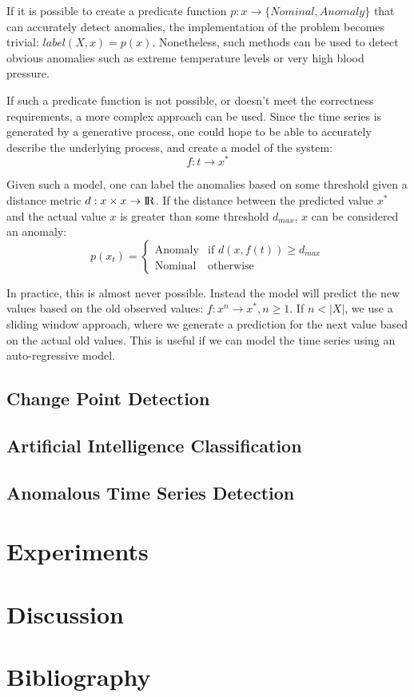 \documentclass{article}
\begin{document}
If it is possible to create a predicate function $p: x \rightarrow \{Nominal, Anomaly\}$ that can accurately detect anomalies, the implementation of the problem becomes trivial: $label(X, x) = p(x)$. Nonetheless, such methods can be used to detect obvious anomalies such as extreme temperature levels or very high blood pressure.

If such a predicate function is not possible, or doesn't meet the correctness requirements, a more complex approach can be used. Since the time series is generated by a generative process, one could hope to be able to accurately describe the underlying process, and create a model of the system:
$$
    f: t \rightarrow x^*
$$

Given such a model, one can label the anomalies based on some threshold given a distance metric $d: x \times x \rightarrow {\rm I\!R}$. If the distance between the predicted value $x^*$ and the actual value $x$ is greater than some threshold $d_{max}$, $x$ can be considered an anomaly:
$$
    p(x_t) =
        \begin{cases}
            \text{Anomaly} & \text{if } d(x, f(t)) \ge d_{max} \\
            \text{Nominal} & \text{otherwise}
        \end{cases}
$$

In practice, this is almost never possible. Instead the model will predict the new values based on the old observed values: $f : x^n \rightarrow x^*, n \ge 1$. If $n < |X|$, we use a sliding window approach, where we generate a prediction for the next value based on the actual old values. This is useful if we can model the time series using an auto-regressive model.

\subsection{Change Point Detection}

\subsection{Artificial Intelligence Classification}

\subsection{Anomalous Time Series Detection}

\section{Experiments \label{experiments}}

\section{Discussion \label{discussion}}

\section*{Bibliography}

\printbibliography
\end{document}
